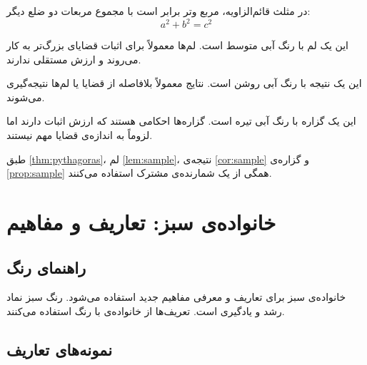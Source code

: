 \documentclass{matinbook}
\begin{document}
\begin{theorem}
    در مثلث قائم‌الزاویه، مربع وتر برابر است با مجموع
    مربعات دو ضلع دیگر:
    \[
        a^{2} + b^{2} = c^{2}
    \]
    \label{thm:pythagoras}
\end{theorem}

\begin{lemma}[لم کمکی]
    این یک لم با رنگ آبی متوسط است. لم‌ها معمولاً برای
    اثبات قضایای بزرگ‌تر به کار می‌روند و ارزش مستقلی
    ندارند.
    \label{lem:sample}
\end{lemma}

\begin{corollary}
    این یک نتیجه با رنگ آبی روشن است. نتایج معمولاً
    بلافاصله از قضایا یا لم‌ها نتیجه‌گیری می‌شوند.
    \label{cor:sample}
\end{corollary}

\begin{proposition}
    این یک گزاره با رنگ آبی تیره است. گزاره‌ها احکامی
    هستند که ارزش اثبات دارند اما لزوماً به اندازه‌ی
    قضایا مهم نیستند.
    \label{prop:sample}
\end{proposition}

طبق \cref{thm:pythagoras}، لم \cref{lem:sample}،
نتیجه‌ی \cref{cor:sample} و گزاره‌ی \cref{prop:sample}
همگی از یک شمارنده‌ی مشترک استفاده می‌کنند.

\chapter{خانواده‌ی سبز: تعاریف و مفاهیم}
\label{chap:family-green}

\section{راهنمای رنگ}
\label{sec:family-green-guide}

خانواده‌ی سبز برای تعاریف و معرفی مفاهیم جدید استفاده
می‌شود. رنگ سبز نماد رشد و یادگیری است. تعریف‌ها از
خانواده‌ی  با رنگ 
استفاده می‌کنند.

\section{نمونه‌های تعاریف}
\label{sec:family-green-samples}
\end{document}
